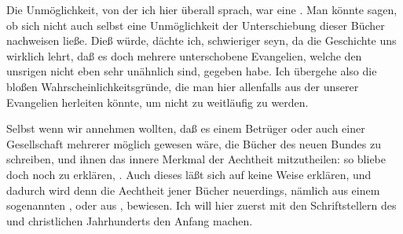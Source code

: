 \begin{RWanm} 
Die Unmöglichkeit, von der ich hier überall sprach, war eine . Man könnte sagen, ob sich nicht auch selbst eine  Unmöglichkeit der Unterschiebung dieser Bücher nachweisen ließe. Dieß würde, dächte ich, schwieriger seyn, da die Geschichte uns wirklich lehrt, daß es doch mehrere unterschobene Evangelien, welche den unsrigen nicht eben sehr unähnlich sind, gegeben habe. Ich übergehe also die bloßen Wahrscheinlichkeitsgründe, die man hier allenfalls aus der  unserer Evangelien herleiten könnte, um nicht zu weitläufig zu werden.~ 
\end{RWanm}

Selbst wenn wir annehmen wollten, daß es einem Betrüger oder auch einer Gesellschaft mehrerer möglich gewesen wäre, die Bücher des neuen Bundes zu schreiben, und ihnen das innere Merkmal der Aechtheit mitzutheilen: so bliebe doch noch  zu erklären, . Auch dieses läßt sich auf keine Weise erklären, und dadurch wird denn die Aechtheit jener Bücher neuerdings, nämlich aus einem sogenannten , oder aus , bewiesen. Ich will hier zuerst mit den Schriftstellern des  und  christlichen Jahrhunderts den Anfang machen.
